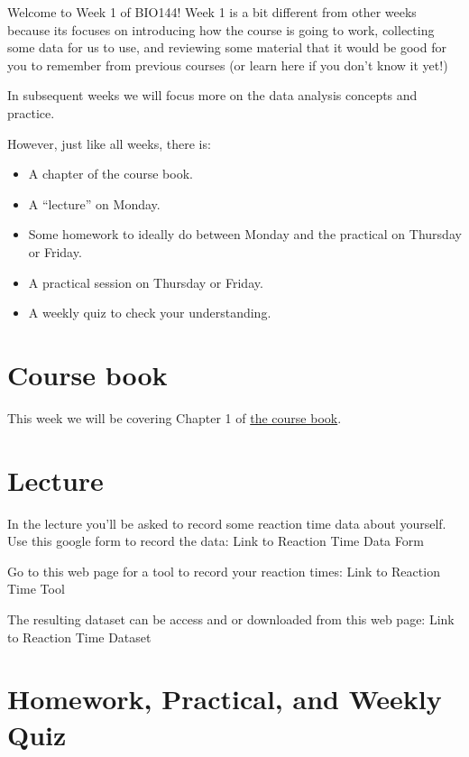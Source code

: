 \documentclass[
  letterpaper,
  8pt,
  a4paper]{book}
\providecommand{\tightlist}{%
  \setlength{\itemsep}{0pt}\setlength{\parskip}{0pt}}
\begin{document}

Welcome to Week 1 of BIO144! Week 1 is a bit different from other weeks
because its focuses on introducing how the course is going to work,
collecting some data for us to use, and reviewing some material that it
would be good for you to remember from previous courses (or learn here
if you don't know it yet!)

In subsequent weeks we will focus more on the data analysis concepts and
practice.

However, just like all weeks, there is:

\begin{itemize}
\tightlist
\item
  A chapter of the course book.
\item
  A ``lecture'' on Monday.
\item
  Some homework to ideally do between Monday and the practical on
  Thursday or Friday.
\item
  A practical session on Thursday or Friday.
\item
  A weekly quiz to check your understanding.
\end{itemize}

\section*{Course book}\label{course-book}


This week we will be covering Chapter 1 of
\href{https://opetchey.github.io/BIO144_Course_Book/}{the course book}.

\section*{Lecture}\label{lecture}


In the lecture you'll be asked to record some reaction time data about
yourself. Use this google form to record the data: Link to Reaction Time
Data Form

Go to this web page for a tool to record your reaction times: Link to
Reaction Time Tool

The resulting dataset can be access and or downloaded from this web
page: Link to Reaction Time Dataset

\section*{Homework, Practical, and Weekly
Quiz}\label{homework-practical-and-weekly-quiz}
\end{document}

